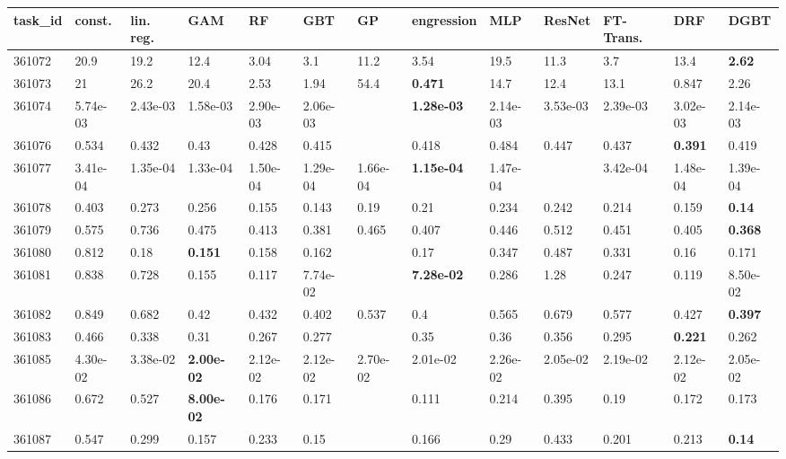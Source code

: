 \begin{table}[ht!]
\centering
\begingroup\footnotesize
\begin{tabular}{lllllllllllll}
  \hline
\hline
task\_id & const. & lin. reg. & GAM & RF & GBT & GP & engression & MLP & ResNet & FT-Trans. & DRF & DGBT \\ 
  \hline
361072 & 20.9 & 19.2 & 12.4 & 3.04 & 3.1 & 11.2 & 3.54 & 19.5 & 11.3 & 3.7 & 13.4 & \textbf{2.62} \\ 
  361073 & 21 & 26.2 & 20.4 & 2.53 & 1.94 & 54.4 & \textbf{0.471} & 14.7 & 12.4 & 13.1 & 0.847 & 2.26 \\ 
  361074 & 5.74e-03 & 2.43e-03 & 1.58e-03 & 2.90e-03 & 2.06e-03 &  & \textbf{1.28e-03} & 2.14e-03 & 3.53e-03 & 2.39e-03 & 3.02e-03 & 2.14e-03 \\ 
  361076 & 0.534 & 0.432 & 0.43 & 0.428 & 0.415 &  & 0.418 & 0.484 & 0.447 & 0.437 & \textbf{0.391} & 0.419 \\ 
  361077 & 3.41e-04 & 1.35e-04 & 1.33e-04 & 1.50e-04 & 1.29e-04 & 1.66e-04 & \textbf{1.15e-04} & 1.47e-04 &  & 3.42e-04 & 1.48e-04 & 1.39e-04 \\ 
  361078 & 0.403 & 0.273 & 0.256 & 0.155 & 0.143 & 0.19 & 0.21 & 0.234 & 0.242 & 0.214 & 0.159 & \textbf{0.14} \\ 
  361079 & 0.575 & 0.736 & 0.475 & 0.413 & 0.381 & 0.465 & 0.407 & 0.446 & 0.512 & 0.451 & 0.405 & \textbf{0.368} \\ 
  361080 & 0.812 & 0.18 & \textbf{0.151} & 0.158 & 0.162 &  & 0.17 & 0.347 & 0.487 & 0.331 & 0.16 & 0.171 \\ 
  361081 & 0.838 & 0.728 & 0.155 & 0.117 & 7.74e-02 &  & \textbf{7.28e-02} & 0.286 & 1.28 & 0.247 & 0.119 & 8.50e-02 \\ 
  361082 & 0.849 & 0.682 & 0.42 & 0.432 & 0.402 & 0.537 & 0.4 & 0.565 & 0.679 & 0.577 & 0.427 & \textbf{0.397} \\ 
  361083 & 0.466 & 0.338 & 0.31 & 0.267 & 0.277 &  & 0.35 & 0.36 & 0.356 & 0.295 & \textbf{0.221} & 0.262 \\ 
  361085 & 4.30e-02 & 3.38e-02 & \textbf{2.00e-02} & 2.12e-02 & 2.12e-02 & 2.70e-02 & 2.01e-02 & 2.26e-02 & 2.05e-02 & 2.19e-02 & 2.12e-02 & 2.05e-02 \\ 
  361086 & 0.672 & 0.527 & \textbf{8.00e-02} & 0.176 & 0.171 &  & 0.111 & 0.214 & 0.395 & 0.19 & 0.172 & 0.173 \\ 
  361087 & 0.547 & 0.299 & 0.157 & 0.233 & 0.15 &  & 0.166 & 0.29 & 0.433 & 0.201 & 0.213 & \textbf{0.14} \\ 

\end{tabular}
\end{table}
